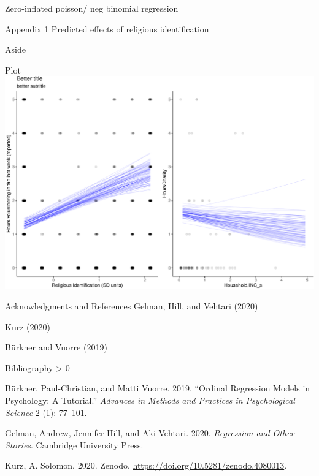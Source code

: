 \documentclass[
  ignorenonframetext,
]{beamer}
\newlength{\cslhangindent}
\newenvironment{CSLReferences}[2] %
 {%
  \setlength{\parindent}{0pt}
  \ifodd #1 \everypar{\setlength{\hangindent}{\cslhangindent}}\ignorespaces\fi
  \ifnum #2 > 0
  \setlength{\parskip}{#2\baselineskip}
  \fi
 }%
 {}
\begin{document}
\begin{frame}[fragile]{Zero-inflated poisson/ neg binomial regression}
\begin{block}{Appendix 1}
Predicted effects of religious identification
\end{block}

\begin{block}{Aside}
\protect\hypertarget{aside}{}
\end{block}

\begin{block}{Plot}
\protect\hypertarget{plot}{}
\includegraphics{slides_files/figure-beamer/unnamed-chunk-74-1.pdf}
\end{block}

\begin{block}{Acknowledgments and References}
\protect\hypertarget{acknowledgments-and-references}{}
Gelman, Hill, and Vehtari (2020)

Kurz (2020)

Bürkner and Vuorre (2019)
\end{block}

\begin{block}{Bibliography}
\protect\hypertarget{bibliography}{}
\hypertarget{refs}{}
\begin{CSLReferences}{1}{0}
\leavevmode\hypertarget{ref-buxfcrkner2019}{}%
Bürkner, Paul-Christian, and Matti Vuorre. 2019. {``Ordinal Regression
Models in Psychology: A Tutorial.''} \emph{Advances in Methods and
Practices in Psychological Science} 2 (1): 77--101.

\leavevmode\hypertarget{ref-gelman2020}{}%
Gelman, Andrew, Jennifer Hill, and Aki Vehtari. 2020. \emph{Regression
and Other Stories}. Cambridge University Press.

\leavevmode\hypertarget{ref-kurz2020}{}%
Kurz, A. Solomon. 2020. Zenodo.
\url{https://doi.org/10.5281/zenodo.4080013}.

\end{CSLReferences}
\end{block}
\end{frame}
\end{document}
